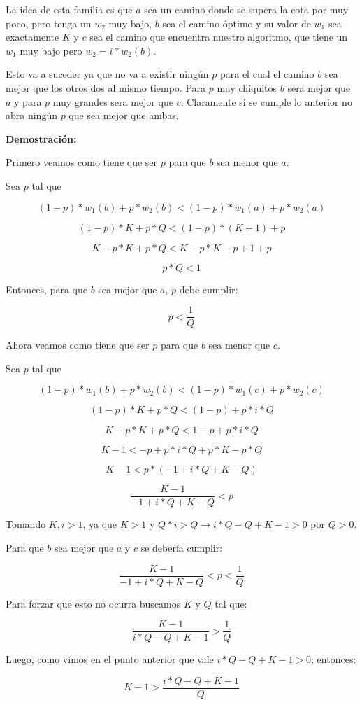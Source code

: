 La idea de esta familia es que $a$ sea un camino donde se supera la cota por muy poco, pero tenga un $w_2$ muy bajo, $b$ sea el camino óptimo y su valor de $w_1$ sea exactamente $K$ y $c$ sea el camino que encuentra nuestro algoritmo, que tiene un $w_1$ muy bajo pero $w_2 = i * w_2(b)$.

Esto va a suceder ya que no va a existir ningún $p$ para el cual el camino $b$ sea mejor que los otros dos al mismo tiempo. Para $p$ muy chiquitos $b$ sera mejor que $a$ y para $p$ muy grandes sera mejor que $c$. Claramente si se cumple lo anterior no abra ningún $p$ que sea mejor que ambas.

\textbf{Demostración:}

Primero veamos como tiene que ser $p$ para que $b$ sea menor que $a$.

Sea $p$ tal que 

$$(1-p)*w_1(b)+p*w_2(b) < (1-p)*w_1(a)+p*w_2(a)$$

$$(1-p)*K+p*Q < (1-p)*(K+1)+p$$

$$K-p*K+p*Q < K-p*K-p+1+p$$

$$p*Q < 1$$

Entonces, para que $b$ sea mejor que $a$, $p$ debe cumplir:

$$p < \frac{1}{Q}$$

Ahora veamos como tiene que ser $p$ para que $b$ sea menor que $c$.

Sea $p$ tal que 

$$(1-p)*w_1(b)+p*w_2(b) < (1-p)*w_1(c)+p*w_2(c)$$

$$(1-p)*K+p*Q < (1-p)+p*i*Q$$

$$K-p*K+p*Q < 1-p+p*i*Q$$

$$K-1 < -p+p*i*Q+p*K-p*Q$$

$$K-1 < p*(-1+i*Q+K-Q)$$

$$\frac{K-1}{-1+i*Q+K-Q} < p$$

Tomando $K,i > 1$, ya que $K > 1$ y $Q*i > Q \rightarrow i*Q-Q+K-1 > 0$ por $Q > 0$.

Para que $b$ sea mejor que $a$ y $c$ se debería cumplir:

$$\frac{K-1}{-1+i*Q+K-Q} < p < \frac{1}{Q}$$

Para forzar que esto no ocurra buscamos $K$ y $Q$ tal que:

$$\frac{K-1}{i*Q-Q+K-1} > \frac{1}{Q}$$

Luego, como vimos en el punto anterior que vale $i*Q-Q+K-1 > 0$; entonces:

$$K-1 > \frac{i*Q-Q+K-1}{Q}$$

